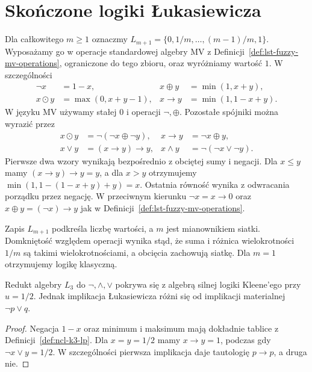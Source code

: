 \section{Skończone logiki Łukasiewicza}
\begin{definicja}
\label{def:ncl-finite-lukasiewicz}
Dla całkowitego $m\geq1$ oznaczmy
$L_{m+1}=\{0,1/m,\ldots,(m-1)/m,1\}$.
Wyposażamy go w operacje standardowej algebry MV
z Definicji~\ref{def:lst-fuzzy-mv-operations},
ograniczone do tego zbioru, oraz wyróżniamy wartość $1$.
W szczególności
\[
 \begin{aligned}
 \neg x&=1-x, & x\oplus y&=\min(1,x+y),\\
 x\odot y&=\max(0,x+y-1), & x\to y&=\min(1,1-x+y).
 \end{aligned}
\]
W języku MV używamy stałej $0$ i operacji
$\neg,\oplus$. Pozostałe spójniki można wyrazić
przez
\[
 \begin{aligned}
 x\odot y&=\neg(\neg x\oplus\neg y),&
 x\to y&=\neg x\oplus y,\\
 x\vee y&=(x\to y)\to y,&
 x\wedge y&=\neg(\neg x\vee\neg y).
 \end{aligned}
\]
Pierwsze dwa wzory wynikają bezpośrednio z obciętej
sumy i negacji. Dla $x\leq y$ mamy $(x\to y)\to y=y$,
a dla $x>y$ otrzymujemy
$\min(1,1-(1-x+y)+y)=x$.
Ostatnia równość wynika z odwracania porządku przez
negację. W przeciwnym kierunku $\neg x=x\to0$
oraz $x\oplus y=(\neg x)\to y$ jak w
Definicji~\ref{def:lst-fuzzy-mv-operations}.
\end{definicja}
Zapis $L_{m+1}$ podkreśla liczbę wartości,
a $m$ jest mianownikiem siatki.
Domkniętość względem operacji wynika stąd, że
suma i różnica wielokrotności $1/m$ są takimi
wielokrotnościami, a obcięcia zachowują siatkę.
Dla $m=1$ otrzymujemy logikę klasyczną.

\begin{stwierdzenie}
\label{prop:ncl-l3-comparison}
Redukt algebry $L_3$ do $\neg,\wedge,\vee$ pokrywa się
z algebrą silnej logiki Kleene'ego przy $u=1/2$.
Jednak implikacja Łukasiewicza różni się od
implikacji materialnej $\neg p\vee q$.
\end{stwierdzenie}
\begin{proof}
Negacja $1-x$ oraz minimum i maksimum mają
dokładnie tablice z Definicji~\ref{def:ncl-k3-lp}.
Dla $x=y=1/2$ mamy $x\to y=1$, podczas gdy
$\neg x\vee y=1/2$. W szczególności pierwsza
implikacja daje tautologię $p\to p$, a druga nie.
\end{proof}

